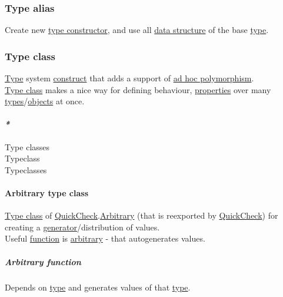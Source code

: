 \documentclass[11pt]{article}
\begin{document}
\subsubsection{\label{orgf988cfb}Type alias}
\label{sec:org3246e8e}
Create new \hyperref[org385fa30]{type constructor}, and use all \hyperref[org51ce163]{data structure} of the base \hyperref[orgc4aea2f]{type}.\\

\subsubsection{\label{org16d8a26}Type class}
\label{sec:org9e89b06}
\hyperref[orgc4aea2f]{Type} system \hyperref[org3eb9b19]{construct} that adds a support of \hyperref[org5f41089]{ad hoc polymorphism}.\\

\hyperref[org16d8a26]{Type class} makes a nice way for defining behaviour, \hyperref[org85fb3a1]{properties} over many \hyperref[org4209edd]{types}/\hyperref[org363acc2]{objects} at once.\\

\paragraph{\emph{*}}
\label{sec:org025434c}

\label{orgead20df}Type classes\\
\label{org4b94384}Typeclass\\
\label{orgfbc1bcf}Typeclasses\\

\paragraph{\label{orgf44b529}Arbitrary type class}
\label{sec:orga4e9657}
\hyperref[org16d8a26]{Type class} of \hyperref[org1fdb89a]{QuickCheck}.\hyperref[orga23d095]{Arbitrary} (that is reexported by \hyperref[org1fdb89a]{QuickCheck}) for creating a \hyperref[org1fe413f]{generator}/distribution of values.\\
Useful \hyperref[orge15bc14]{function} is \hyperref[orga23d095]{arbitrary} - that autogenerates values.\\

\subparagraph{\label{org2e2e58b}Arbitrary function}
\label{sec:orgf8c32f1}
Depends on \hyperref[orgc4aea2f]{type} and generates values of that \hyperref[orgc4aea2f]{type}.\\
\end{document}

